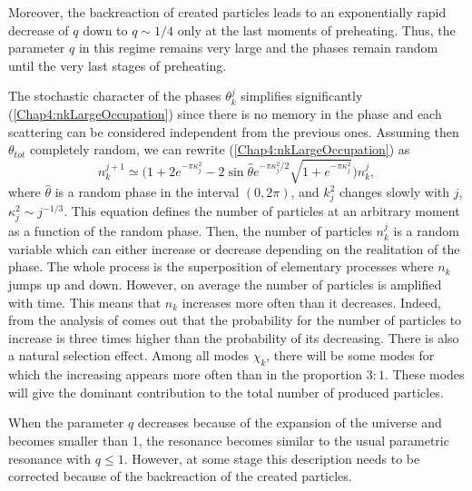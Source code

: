 \documentclass[11pt,a4paper,twoside]{book}
\begin{document}
Moreover, the backreaction of created particles leads to an exponentially rapid decrease of $ q $ down to $ q \sim 1/4 $ only at the last moments of preheating. Thus, the parameter $ q $ in this regime remains very large and the phases remain random until the very last stages of preheating.

The stochastic character of the phases $ \theta_{k}^{j} $ simplifies significantly (\ref{Chap4:nkLargeOccupation}) since there is no memory in the phase and each scattering can be considered  independent from the previous ones.
Assuming then $\theta_{tot}$ completely random, we can rewrite (\ref{Chap4:nkLargeOccupation}) as
\begin{equation}
\label{Chap4:numberkRandom}
	n_{k}^{j+1} \simeq \Bigg(1 + 2 e^{-\pi\kappa_{j}^{2}} -2\sin\hat{\theta}e^{-\pi\kappa_{j}^{2}/2}\sqrt{1+e^{-\pi\kappa_{j}^{2}}}\Bigg)n_{k}^{j},
\end{equation}
where $\hat{\theta}$ is a random phase in the interval $ (0,2\pi) $, and $ k_{j}^{2} $ changes slowly with $ j $, $\kappa_{j}^{2} \sim j^{-1/3}$.
This equation defines the number of particles at an arbitrary moment as a function of the random phase. Then, the number of particles $ n_{k}^{j} $ is a random variable which can either increase or decrease depending on the realitation of the phase. The whole process is the superposition of elementary processes where $ n_{k} $ jumps up and down. However, on average the number of particles is amplified with time. This means that $ n_{k} $ increases more often than it decreases. Indeed, from the analysis of \cite{Chap4:LindePreheatingModel} comes out that the probability for the number of particles to increase is three times higher than the probability of its decreasing. There is also a natural selection effect. Among all modes $ \chi_{k} $, there will be some modes for which the increasing appears more often than in the proportion $ 3:1 $. These modes will give the dominant contribution to the total number of produced particles.

When the parameter $ q $ decreases because of the expansion of the universe and becomes smaller than 1, the resonance becomes similar to the usual parametric resonance with $ q\le 1 $. However, at some stage this description needs to be corrected because of the backreaction of the created particles.
\end{document}
